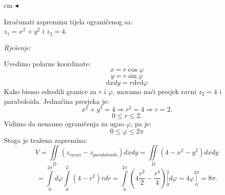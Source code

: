 \documentclass[a4paper,11pt]{article}
\begin{document}
 cm $\blacktriangleleft$ \\
 \begin{tcolorbox}[colback=brown!35!white,colframe=white!75!white,title= $$\bullet \bullet \bullet$$]
         \begin{zadatak}
Izračunati zapreminu tijela ograničenog sa: \\ $z_1 = x^{2} + y^{2} $  i $z_2 =4.$
\end{zadatak}
\end{tcolorbox}
\emph{Rješenje: }
\begin{center}
\end{center}
Uvedimo polarne koordinate:
$$x = r \cos{\varphi}$$
$$y = r \sin{\varphi}$$
 $$\mathrm dxdy = r  \mathrm d r  \mathrm d\varphi$$
 Kako bismo odredili granice za $r$ i $\varphi$, moramo naći presjek ravni $z_2 = 4$ i paraboloida. Jednačina presjeka je:
 $$ x^{2} + y^{2} = 4 \Rightarrow r^{2} = 4 \Rightarrow r =2.$$
 $$0 \leq r \leq 2.$$
 Vidimo da nemamo ograničenja za ugao $\varphi$, pa je:
 $$0 \leq \varphi \leq 2\pi$$
 Stoga je tražena zapremina:
$$ V 	 =\iint\limits_{ D }\left( z_{ravni}- z_{paraboloida}\right) dx dy=\iint\limits_{D}\left( 4-x^{2}-y^{2}\right) dx dy$$ 	   
  	$$ =\int\limits_{0}^{2\pi } d\varphi \int\limits_{0}^{2}( 4-r^{2})r dr =\int\limits_{0}^{2\pi }\left(4\frac{r^{2}  }{2} - \frac{r^{4}  }{4} \right) \underset{0}{\overset{2 }{ \bigg\vert}}d\varphi =4\varphi \underset{0}{\overset{2\pi }{ \bigg\vert}}=8\pi.$$ 	
\end{document}
